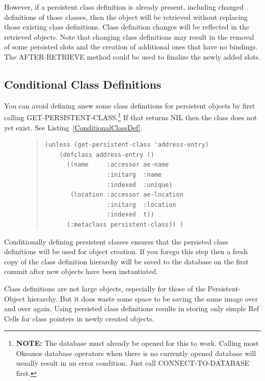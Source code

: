 \documentclass[article,oneside]{memoir}
\begin{document}
However, if a persistent class definition is already present, including changed definitions of those classes, then the object will be retrieved without replacing those existing class definitions. Class definition changes will be reflected in the retrieved objects. Note that changing class definitions may result in the removal of some persisted slots and the creation of additional ones that have no bindings. The {\ttfamily AFTER-RETRIEVE} method could be used to finalize the newly added slots.

\subsection{Conditional Class Definitions}
You can avoid defining anew some class definitions for persistent objects by first calling {\ttfamily GET-PERSISTENT-CLASS}.\footnote{\textbf{NOTE:} The database must already be opened for this to work. Calling most Okeanos database operators when there is no currently opened database will usually result in an error condition. Just call {\ttfamily CONNECT-TO-DATABASE} first.} If that returns NIL then the class does not yet exist. See Listing~\ref{ConditionalClassDef}.

\begin{figure}[!htbp]
\begin{quote}
\begin{lstlisting}
(unless (get-persistent-class 'address-entry)
    (defclass address-entry ()
      ((name     :accessor ae-name
                 :initarg  :name
                 :indexed  :unique)
       (location :accessor ae-location 
                 :initarg  :location
                 :indexed  t))
      (:metaclass persistent-class)) )
\end{lstlisting}
\end{quote}
\end{figure}

Conditionally defining persistent classes ensures that the persisted class definitions will be used for object creation. If you forego this step then a fresh copy of the class definition hierarchy will be saved to the database on the first commit after new objects have been instantiated. 

Class definitions are not large objects, especially for those of the {\ttfamily Persistent-Object} hierarchy. But it does waste some space to be saving the same image over and over again. Using persisted class definitions results in storing only simple Ref Cells for class pointers in newly created objects.
\end{document}
